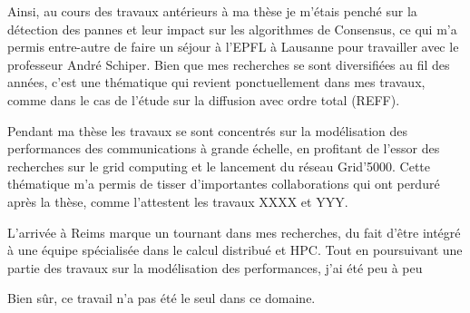 
Ainsi, au cours des travaux antérieurs à ma thèse je m'étais penché sur la détection des pannes et leur impact sur les algorithmes de Consensus, ce qui m'a permis entre-autre de faire un séjour à l'EPFL à Lausanne pour travailler avec le professeur André Schiper. Bien que mes recherches se sont diversifiées au fil des années, c'est une thématique qui revient ponctuellement dans mes travaux, comme dans le cas de l'étude sur la diffusion avec ordre total (REFF).

Pendant ma thèse les travaux se sont concentrés sur la modélisation des performances des communications à grande échelle, en profitant de l'essor des recherches sur le grid computing et le lancement du réseau Grid'5000. Cette thématique m'a permis de tisser d'importantes collaborations qui ont perduré après la thèse, comme l'attestent les travaux XXXX et YYY.

L'arrivée à Reims marque un tournant dans mes recherches, du fait d'être intégré à une équipe spécialisée dans le calcul distribué et HPC. Tout en poursuivant une partie des travaux sur la modélisation des performances, j'ai été peu à peu  



Bien sûr, ce travail n'a pas été le seul dans ce domaine. 
	